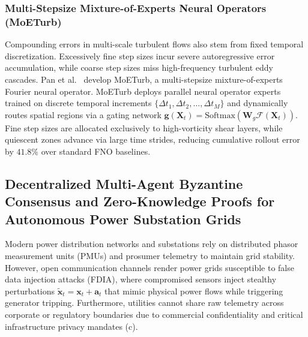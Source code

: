 \subsubsection{Multi-Stepsize Mixture-of-Experts Neural Operators (MoETurb)}
Compounding errors in multi-scale turbulent flows also stem from fixed temporal discretization. Excessively fine step sizes incur severe autoregressive error accumulation, while coarse step sizes miss high-frequency turbulent eddy cascades. Pan et al.~\cite{Pan2026MoETurb} develop MoETurb, a multi-stepsize mixture-of-experts Fourier neural operator. MoETurb deploys parallel neural operator experts trained on discrete temporal increments $\{\Delta t_1, \Delta t_2, \dots, \Delta t_M\}$ and dynamically routes spatial regions via a gating network $\mathbf{g}(\mathbf{X}_t) = \text{Softmax}(\mathbf{W}_g \mathcal{F}(\mathbf{X}_t))$. Fine step sizes are allocated exclusively to high-vorticity shear layers, while quiescent zones advance via large time strides, reducing cumulative rollout error by $41.8\%$ over standard FNO baselines.

\subsection{Decentralized Multi-Agent Byzantine Consensus and Zero-Knowledge Proofs for Autonomous Power Substation Grids}
\label{sec:byzantine_zk_substation}
Modern power distribution networks and substations rely on distributed phasor measurement units (PMUs) and prosumer telemetry to maintain grid stability. However, open communication channels render power grids susceptible to false data injection attacks (FDIA), where compromised sensors inject stealthy perturbations $\tilde{\mathbf{x}}_t = \mathbf{x}_t + \mathbf{a}_t$ that mimic physical power flows while triggering generator tripping. Furthermore, utilities cannot share raw telemetry across corporate or regulatory boundaries due to commercial confidentiality and critical infrastructure privacy mandates (c).

